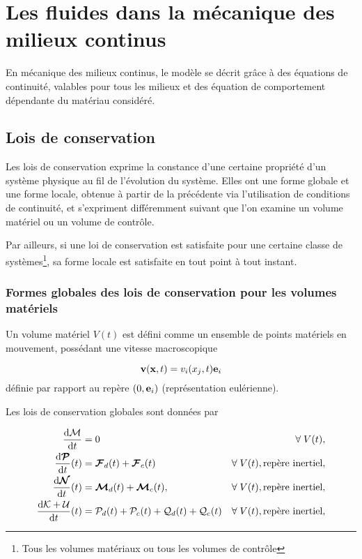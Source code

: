 
\chapter{Les fluides dans la mécanique des milieux continus}
  En mécanique des milieux continus, le modèle se décrit grâce à des équations de continuité, valables pour tous les milieux et des équation de comportement dépendante du matériau considéré.

  \section{Lois de conservation}
    Les lois de conservation exprime la constance d'une certaine propriété d'un système physique au fil de l'évolution du système. Elles ont une forme globale et une forme locale, obtenue à partir de la précédente via l'utilisation de conditions de continuité, et s'expriment différemment suivant que l'on examine un volume matériel ou un volume de contrôle.

    Par ailleurs, si une loi de conservation est satisfaite pour une certaine classe de systèmes\footnote{Tous les volumes matériaux ou tous les volumes de contrôle}, sa forme locale est satisfaite en tout point à tout instant.

    \subsection{Formes globales des lois de conservation pour les volumes matériels}
      Un volume matériel $V(t)$ est défini comme un ensemble de points matériels en mouvement, possédant une vitesse macroscopique

      \begin{equation}
        \vb{v}(\vb{x}, t) = v_i(x_j, t)\vb{e}_i
      \end{equation}
      définie par rapport au repère $(0, \vb{e}_i)$ (représentation eulérienne).

      Les lois de conservation globales sont données par

      \begin{equation}\begin{aligned}
        \dv{\mathcal{M}}{t} &= 0 & \forall \; V(t),\\
        \dv{\boldsymbol{\mathcal{P}}}{t} {}(t) &= \boldsymbol{\mathcal{F}}_d(t) + \boldsymbol{\mathcal{F}}_c(t) & \forall \; V(t), \textrm{repère inertiel},\\
        \dv{\boldsymbol{\mathcal{N}}}{t} {}(t) &= \boldsymbol{\mathcal{M}}_d(t) + \boldsymbol{\mathcal{M}}_c(t), & \forall \; V(t), \textrm{repère inertiel}, \\
        \dv{\mathcal{K} + \mathcal{U}}{t} {}(t) &= \mathcal{P}_d(t) + \mathcal{P}_c(t) + \mathcal{Q}_d(t) + \mathcal{Q}_c(t) & \forall \; V(t), \textrm{repère inertiel},
      \end{aligned}\end{equation}

